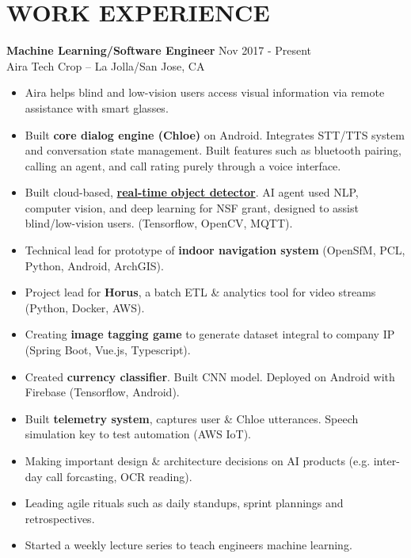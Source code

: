 \documentclass[line,mm]{res}
\begin{document}
\section{WORK EXPERIENCE} 
{\bf Machine Learning/Software Engineer } \hfill Nov 2017 - Present \\
  Aira Tech Crop -- La Jolla/San Jose, CA
  \begin{itemize}  \itemsep -2pt %
    \item Aira helps blind and low-vision users access visual information via remote assistance with smart glasses. 
    \item Built {\bf core dialog engine (Chloe)} on Android. Integrates STT/TTS system and conversation state management. Built features such as bluetooth pairing, calling an agent, and call rating purely through a voice interface. 
    \item Built cloud-based, \href{https://github.com/aira/object_detector}{{\bf real-time object detector}}.  AI agent used NLP, computer vision, and deep learning for NSF grant, designed to assist blind/low-vision users. (Tensorflow, OpenCV, MQTT).
    \item Technical lead for prototype of {\bf indoor navigation system} (OpenSfM, PCL, Python, Android, ArchGIS). 
    \item Project lead for {\bf Horus}, a batch ETL \& analytics tool for video streams (Python, Docker, AWS).
    \item Creating {\bf image tagging game} to generate dataset integral to company IP (Spring Boot, Vue.js, Typescript).
    \item Created {\bf currency classifier}. Built CNN model. Deployed on Android with Firebase (Tensorflow, Android).
    \item Built {\bf telemetry system}, captures user \& Chloe utterances. Speech simulation key to test automation (AWS IoT).
    \item Making important design \& architecture decisions on AI products (e.g. inter-day call forcasting, OCR reading).
    \item Leading agile rituals such as daily standups, sprint plannings and retrospectives.
    \item Started a weekly lecture series to teach engineers machine learning. 
  \end{itemize} 
\end{document}
